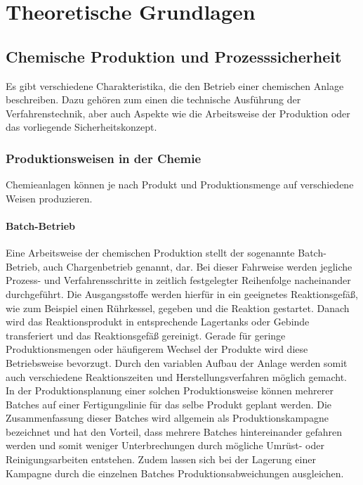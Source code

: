 \section{Theoretische Grundlagen}
\label{sec:grundlagen}



\subsection{Chemische Produktion und Prozesssicherheit}
Es gibt verschiedene Charakteristika, die den Betrieb einer chemischen Anlage beschreiben. Dazu gehören zum einen die technische Ausführung der Verfahrenstechnik, aber auch Aspekte wie die Arbeitsweise der Produktion oder das vorliegende Sicherheitskonzept.

\subsubsection{Produktionsweisen in der Chemie}
Chemieanlagen können je nach Produkt und Produktionsmenge auf verschiedene Weisen produzieren. 

\paragraph{Batch-Betrieb} Eine Arbeitsweise der chemischen Produktion stellt der sogenannte Batch-Betrieb, auch Chargenbetrieb genannt, dar. Bei dieser Fahrweise werden jegliche Prozess- und Verfahrensschritte in zeitlich festgelegter Reihenfolge nacheinander durchgeführt. Die Ausgangsstoffe werden hierfür in ein geeignetes Reaktionsgefäß, wie zum Beispiel einen Rührkessel, gegeben und die Reaktion gestartet. Danach wird das Reaktionsprodukt in entsprechende Lagertanks oder Gebinde transferiert und das Reaktionsgefäß gereinigt.\linebreak
Gerade für geringe Produktionsmengen oder häufigerem Wechsel der Produkte wird diese Betriebsweise bevorzugt. Durch den variablen Aufbau der Anlage werden somit auch verschiedene Reaktionszeiten und Herstellungsverfahren möglich gemacht.\,\cite{Ignatowitz.2015}\linebreak
In der Produktionsplanung einer solchen Produktionsweise können mehrerer Batches auf einer Fertigungslinie für das selbe Produkt geplant werden. Die Zusammenfassung dieser Batches wird allgemein als Produktionskampagne bezeichnet und hat den Vorteil, dass mehrere Batches hintereinander gefahren werden und somit weniger Unterbrechungen durch mögliche Umrüst- oder Reinigungsarbeiten entstehen. Zudem lassen sich bei der Lagerung einer Kampagne durch die einzelnen Batches Produktionsabweichungen ausgleichen.\,\cite{SAP.04.02.2022}

